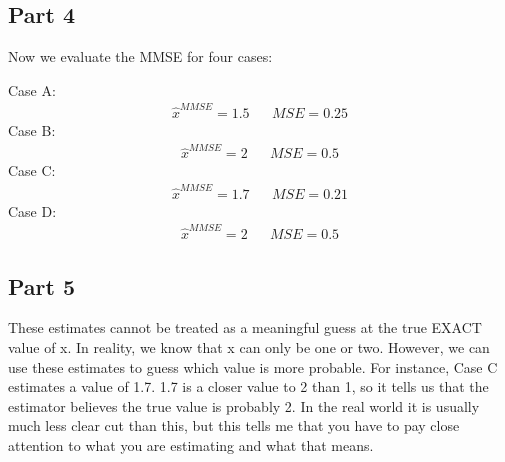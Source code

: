 \documentclass{article}
\begin{document}
\subsection*{Part 4}
Now we evaluate the MMSE for four cases:

Case A:
\begin{align*}
\hat{x}^{MMSE} = 1.5 && MSE = 0.25
\end{align*}
Case B:
\begin{align*}
\hat{x}^{MMSE} = 2 && MSE = 0.5
\end{align*}
Case C:
\begin{align*}
\hat{x}^{MMSE} = 1.7 && MSE = 0.21
\end{align*}
Case D:
\begin{align*}
\hat{x}^{MMSE} = 2 && MSE = 0.5
\end{align*}
\subsection*{Part 5}
	These estimates cannot be treated as a meaningful guess at the true EXACT value of x. In reality, we know that x can only be one or two. However, we can use these estimates to guess which value is more probable. For instance, Case C estimates a value of 1.7. 1.7 is a closer value to 2 than 1, so it tells us that the estimator believes the true value is probably 2. In the real world it is usually much less clear cut than this, but this tells me that you have to pay close attention to what you are estimating and what that means.
\end{document}
